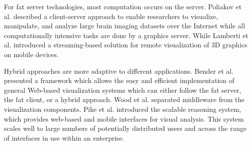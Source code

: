 \documentclass{article}
\begin{document}
 
For fat server technologies, most computation occurs on the server.
Poliakov et al.\cite{poliakov2005server} described a client-server approach to enable researchers to visualize, manipulate, and analyze large brain imaging datasets over the Internet while all computationally intensive tasks are done by a graphics server.
While Lamberti et al.\cite{lamberti2007streaming} introduced a streaming-based solution for
remote visualization of 3D graphics on mobile devices.

Hybrid approaches are more adaptive to different applications.
Bender et al.\cite{bender2000functional} presented a framework which allows the easy and efficient implementation of general Web-based visualization systems which can either follow the fat server, the fat client, or a hybrid approach.
Wood et al.\cite{wood2008web} separated middleware from the visualization components. 
Pike et al.\cite{pike2009scalable} introduced the scalable reasoning system, which provides web-based and mobile interfaces for visual analysis. This system scales well to large
numbers of potentially distributed users and across the range of interfaces in use within an enterprise.




\end{document}
